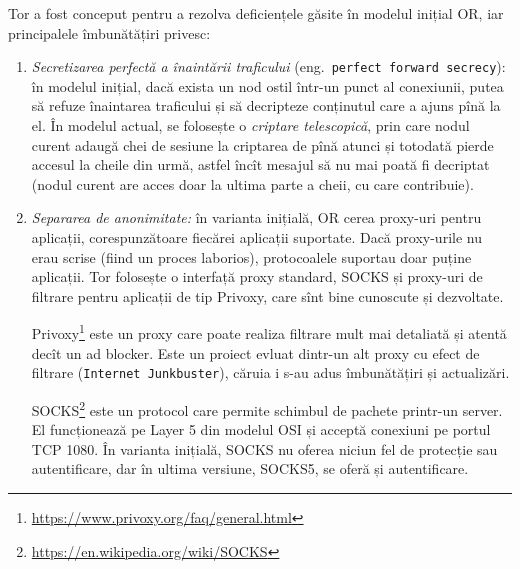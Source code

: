 Tor a fost conceput pentru a rezolva deficiențele găsite în modelul inițial OR,
iar principalele îmbunătățiri privesc:
\begin{enumerate}[(1)]
  \item \textit{Secretizarea perfectă a înaintării traficului} (eng.\ \texttt{perfect
    forward secrecy}): în modelul inițial, dacă exista un nod ostil într-un punct
    al conexiunii, putea să refuze înaintarea traficului și să decripteze
    conținutul care a ajuns pînă la el. În modelul actual, se folosește o
    \emph{criptare telescopică}, prin care nodul curent adaugă chei
    de sesiune la criptarea de pînă atunci și totodată pierde accesul la cheile din
    urmă, astfel încît mesajul să nu mai poată fi decriptat (nodul curent are
    acces doar la ultima parte a cheii, cu care contribuie).
  \item \textit{Separarea  de anonimitate:} în varianta
    inițială, OR cerea proxy-uri pentru aplicații, corespunzătoare fiecărei
    aplicații suportate. Dacă proxy-urile nu erau scrise (fiind un proces laborios),
    protocoalele suportau doar puține aplicații. Tor folosește o interfață
    proxy standard, SOCKS și proxy-uri de filtrare pentru aplicații de tip
    Privoxy, care sînt bine cunoscute și dezvoltate.

    Privoxy\footnote{\url{https://www.privoxy.org/faq/general.html}} este un proxy
    care poate realiza filtrare mult mai detaliată și atentă decît un ad blocker.
    Este un proiect evluat dintr-un alt proxy cu efect de filtrare (\texttt{Internet Junkbuster}),
    căruia i s-au adus îmbunătățiri și actualizări.

    SOCKS\footnote{\url{https://en.wikipedia.org/wiki/SOCKS}} este un protocol care permite
    schimbul de pachete printr-un server. El funcționează pe Layer 5 din modelul OSI
    și acceptă conexiuni pe portul TCP 1080. În varianta inițială, SOCKS nu oferea niciun
    fel de protecție sau autentificare, dar în ultima versiune, SOCKS5, se oferă
    și autentificare.


\end{enumerate}
